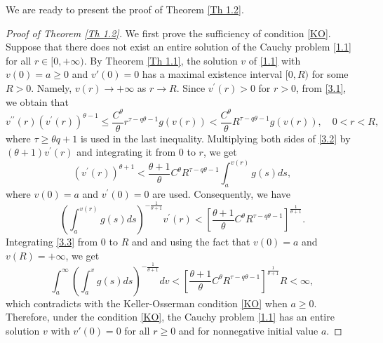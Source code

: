 \documentclass[a4paper,11pt]{amsart}
\theoremstyle{plain}
\theoremstyle{remark}
\numberwithin{equation}{section}
\numberwithin{figure}{section}
\numberwithin{remark}{section}
\begin{document}
\begin{sloppypar}
We are ready to present the proof of Theorem \ref{Th 1.2}. 
\begin{proof}[Proof of Theorem \ref{Th 1.2}]
We first prove the sufficiency of condition \eqref{KO}. Suppose that there does not exist an entire solution of the Cauchy problem \eqref{1.1} for all $r\in [0, +\infty)$. By Theorem \ref{Th 1.1}, the solution $v$ of \eqref{1.1} with $v(0)=a\ge 0$ and $v'(0)=0$ has a maximal existence interval $[0, R)$ for some $R>0$. Namely, $v(r)\rightarrow +\infty$ as $r\rightarrow R$. Since $v^{\prime}(r)>0$ for $r>0$, from \eqref{3.1}, we obtain that
\begin{equation}\label{3.2}
v^{\prime\prime}(r)\left( v^{\prime}(r)\right)^{\theta-1}
\le \frac{C^\theta}{\theta}r^{\tau-q\theta -1} g(v(r))
< \frac{C^\theta}{\theta}R^{\tau-q\theta -1} g(v(r)), \quad 0<r<R,
\end{equation}
where $\tau \ge \theta q+1$ is used in the last inequality.
Multiplying both sides of \eqref{3.2} by $(\theta+1)v^{\prime}(r)$ and integrating it from $0$ to $r$, we get
\begin{equation*}
	\left( 	v^{\prime}(r)\right) ^{\theta +1}<\frac{\theta +1}{\theta} C^\theta R^{\tau-q\theta -1} \int_{a}^{v(r)}g (s)ds,
\end{equation*}
where $v(0)=a$ and $v^{\prime}(0)=0$ are used.
Consequently, we have
\begin{equation}\label{3.3}
\left( \int_{a}^{v(r)}g(s)ds\right) ^{-\frac{1}{\theta+1}}v^{\prime}(r)< \left [ \frac{\theta +1}{\theta} C^\theta R^{\tau-q\theta -1} \right]^{\frac{1}{\theta+1}}.
\end{equation}
Integrating \eqref{3.3}  from $0$ to $R$ and and using the fact that $v(0)=a$ and $v(R)=+\infty$, we get
\begin{equation*}
	\int_{a}^{\infty}\left( \int_{a}^{v}g(s)ds\right) ^{-\frac{1}{\theta+1}}dv<\left [ \frac{\theta +1}{\theta} C^\theta R^{\tau-q\theta -1} \right]^{\frac{1}{\theta+1}}R<\infty,
\end{equation*}
which contradicts with the Keller-Osserman condition \eqref{KO} when $a\ge 0$. Therefore, under the condition \eqref{KO}, the Cauchy problem \eqref{1.1} has an entire solution $v$ with $v'(0)=0$ for all $r\ge 0$ and for nonnegative initial value $a$.

\vspace{2mm}




\end{proof}
\end{sloppypar}
\end{document}
